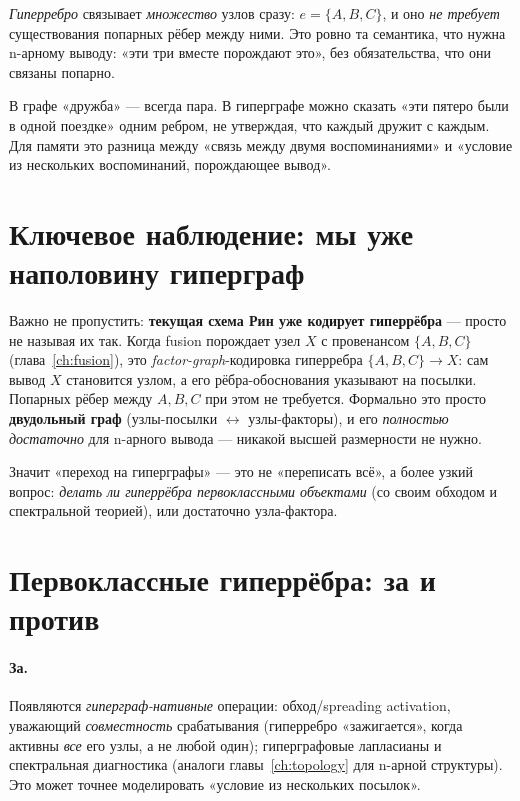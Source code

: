 \emph{Гиперребро} связывает \emph{множество} узлов сразу: $e=\{A,B,C\}$, и оно
\emph{не требует} существования попарных рёбер между ними. Это ровно та семантика,
что нужна n-арному выводу: «эти три вместе порождают это», без обязательства, что
они связаны попарно.

\begin{intuition}
В графе «дружба» — всегда пара. В гиперграфе можно сказать «эти пятеро были в одной
поездке» одним ребром, не утверждая, что каждый дружит с каждым. Для памяти это
разница между «связь между двумя воспоминаниями» и «условие из нескольких
воспоминаний, порождающее вывод».
\end{intuition}

\section{Ключевое наблюдение: мы уже наполовину гиперграф}

Важно не пропустить: \textbf{текущая схема Рин уже кодирует гиперрёбра} — просто не
называя их так. Когда fusion порождает узел $X$ с провенансом $\{A,B,C\}$
(глава~\ref{ch:fusion}), это \emph{factor-graph}-кодировка гиперребра
$\{A,B,C\}\to X$: сам вывод $X$ становится узлом, а его рёбра-обоснования указывают
на посылки. Попарных рёбер между $A,B,C$ при этом не требуется. Формально это просто
\textbf{двудольный граф} (узлы-посылки $\leftrightarrow$ узлы-факторы), и его
\emph{полностью достаточно} для n-арного вывода — никакой высшей размерности не нужно.

Значит «переход на гиперграфы» — это не «переписать всё», а более узкий вопрос:
\emph{делать ли гиперрёбра первоклассными объектами} (со своим обходом и спектральной
теорией), или достаточно узла-фактора.

\section{Первоклассные гиперрёбра: за и против}

\paragraph{За.} Появляются \emph{гиперграф-нативные} операции: обход/spreading
activation, уважающий \emph{совместность} срабатывания (гиперребро «зажигается»,
когда активны \emph{все} его узлы, а не любой один); гиперграфовые лапласианы и
спектральная диагностика (аналоги главы~\ref{ch:topology} для n-арной структуры). Это
может точнее моделировать «условие из нескольких посылок».

